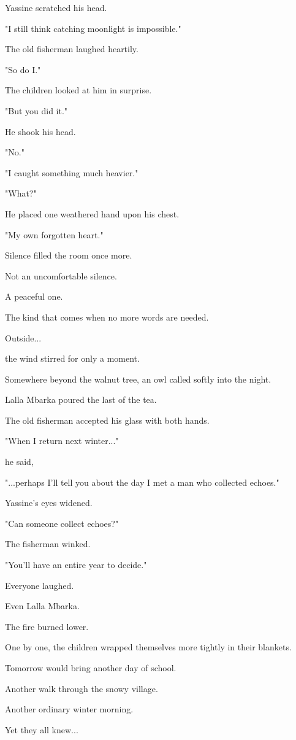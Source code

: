 \documentclass[12pt,openany]{book}
\begin{document}
Yassine scratched his head.

"I still think catching moonlight is impossible."

The old fisherman laughed heartily.

"So do I."

The children looked at him in surprise.

"But you did it."

He shook his head.

"No."

"I caught something much heavier."

"What?"

He placed one weathered hand upon his chest.

"My own forgotten heart."

Silence filled the room once more.

Not an uncomfortable silence.

A peaceful one.

The kind that comes when no more words are needed.

Outside...

the wind stirred for only a moment.

Somewhere beyond the walnut tree, an owl called softly into the night.

Lalla Mbarka poured the last of the tea.

The old fisherman accepted his glass with both hands.

"When I return next winter..."

he said,

"...perhaps I'll tell you about the day I met a man who collected echoes."

Yassine's eyes widened.

"Can someone collect echoes?"

The fisherman winked.

"You'll have an entire year to decide."

Everyone laughed.

Even Lalla Mbarka.

The fire burned lower.

One by one, the children wrapped themselves more tightly in their blankets.

Tomorrow would bring another day of school.

Another walk through the snowy village.

Another ordinary winter morning.

Yet they all knew...
\end{document}
